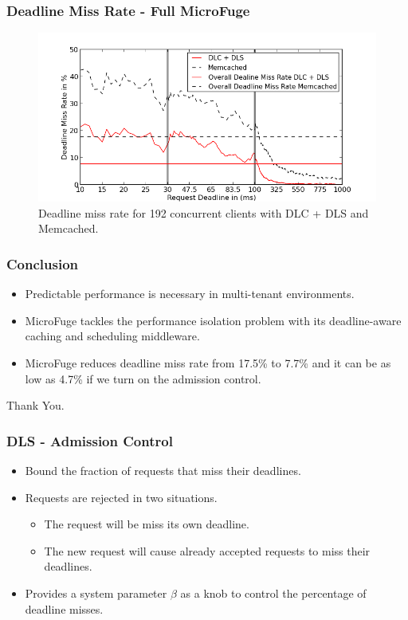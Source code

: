 \documentclass{beamer}
\newcommand{\myv}{\vspace{3 mm}}
\begin{document}
\begin{frame}
  \frametitle{Deadline Miss Rate - \textbf{Full MicroFuge}}
  \begin{figure}[t]
    \begin{center}
      \centerline{\includegraphics[scale=0.5]{img/EC2/EC2_SH_MM/miss_48.png}}
      \caption{Deadline miss rate for 192 concurrent clients with DLC + DLS and Memcached.}
      \label{fig:miss_192_sh_mm}
    \end{center}
  \end{figure}
\end{frame}


\begin{frame}
  \frametitle{Conclusion}
  \begin{itemize}
  \item Predictable performance is necessary in multi-tenant environments.
    \myv
  \item MicroFuge tackles the performance isolation problem with its
    deadline-aware caching and scheduling middleware.
    \myv
  \item MicroFuge reduces deadline miss rate from 17.5\% to 7.7\% and it can be
    as low as 4.7\% if we turn on the admission control.
  \end{itemize}
\end{frame}

\begin{frame}
  \centerline{Thank You.}
\end{frame}

\begin{frame}
  \frametitle{DLS - Admission Control}
  \begin{itemize}
  \item Bound the fraction of requests that miss their deadlines.
  \item Requests are rejected in two situations.
    \begin{itemize}
    \item The request will be miss its own deadline.
    \item The new request will cause already accepted requests to miss their deadlines.
    \end{itemize}
  \item Provides a system parameter $\beta$ as a knob to control the percentage
    of deadline misses.
  \end{itemize}
\end{frame}
\end{document}
